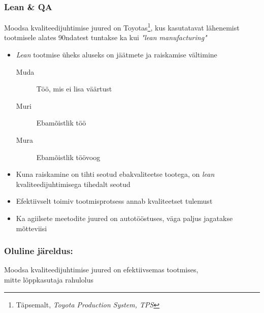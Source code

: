 \begin{frame}[fragile]
  \frametitle{Lean \& QA}
	Moodsa kvaliteedijuhtimise juured on Toyotas\footnote{Täpsemalt, \emph{Toyota Production System, TPS}}, kus kasutatavat lähenemist tootmisele alates 90ndatest tuntakse ka kui \emph{"lean manufacturing"}  

	\begin{itemize}
		\item \emph{Lean} tootmise üheks aluseks on jäätmete ja raiskamise vältimine
		\begin{description}
			\item[Muda] Töö, mis ei lisa väärtust
			\item[Muri] Ebamõistlik töö
			\item[Mura] Ebamõistlik töövoog
		\end{description}
		\item Kuna raiskamine on tihti seotud ebakvaliteetse tootega, on \emph{lean} kvaliteedijuhtimisega tihedalt seotud
		\item Efektiivselt toimiv tootmisprotsess annab kvaliteetset tulemust
		\item Ka agiilsete meetodite juured on autotööstuses, väga paljus jagatakse mõtteviisi
	\end{itemize}
\end{frame}

\begin{frame}[fragile]
	\frametitle{Oluline järeldus:}
	\vfill
	\begin{center}
		Moodsa kvaliteedijuhtimise juured on efektiivsemas tootmises,\\ mitte lõppkasutaja rahulolus
	\end{center}
	\vfill
\end{frame}

